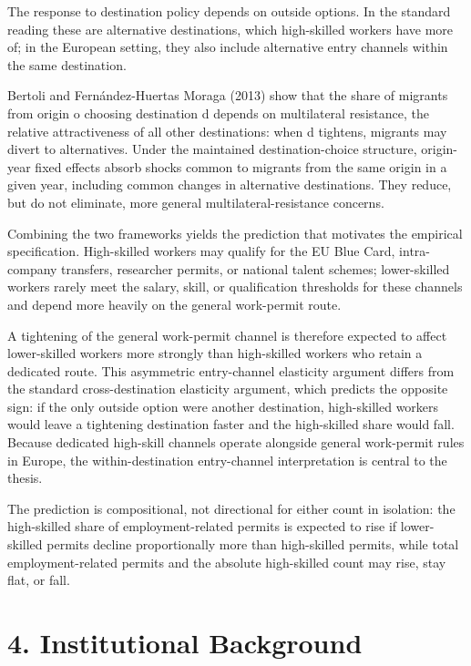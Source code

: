 \documentclass[11pt,a4paper]{article}
\begin{document}
The response to destination policy depends on outside options. In the
standard reading these are alternative destinations, which high-skilled
workers have more of; in the European setting, they also include
alternative entry channels within the same destination.

Bertoli and Fernández-Huertas Moraga (2013) show that the share of
migrants from origin o choosing destination d depends on multilateral
resistance, the relative attractiveness of all other destinations: when
d tightens, migrants may divert to alternatives. Under the maintained
destination-choice structure, origin-year fixed effects absorb shocks
common to migrants from the same origin in a given year, including
common changes in alternative destinations. They reduce, but do not
eliminate, more general multilateral-resistance concerns.

Combining the two frameworks yields the prediction that motivates the
empirical specification. High-skilled workers may qualify for the EU
Blue Card, intra-company transfers, researcher permits, or national
talent schemes; lower-skilled workers rarely meet the salary, skill, or
qualification thresholds for these channels and depend more heavily on
the general work-permit route.

A tightening of the general work-permit channel is therefore expected to
affect lower-skilled workers more strongly than high-skilled workers who
retain a dedicated route. This asymmetric entry-channel elasticity
argument differs from the standard cross-destination elasticity
argument, which predicts the opposite sign: if the only outside option
were another destination, high-skilled workers would leave a tightening
destination faster and the high-skilled share would fall. Because
dedicated high-skill channels operate alongside general work-permit
rules in Europe, the within-destination entry-channel interpretation is
central to the thesis.

The prediction is compositional, not directional for either count in
isolation: the high-skilled share of employment-related permits is
expected to rise if lower-skilled permits decline proportionally more
than high-skilled permits, while total employment-related permits and
the absolute high-skilled count may rise, stay flat, or fall.

\section{4. Institutional Background}\label{institutional-background}
\end{document}
